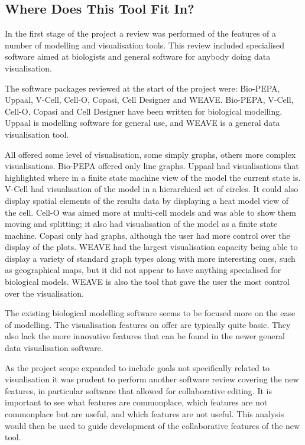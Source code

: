 \subsection{Where Does This Tool Fit In?}

In the first stage of the project a review was performed of the features of a number of modelling and visualisation tools.  This review included specialised software aimed at biologists and general software for anybody doing data visualisation.

The software packages reviewed at the start of the project were: Bio-PEPA, Uppaal, V-Cell, Cell-O, Copasi, Cell Designer and WEAVE.  Bio-PEPA, V-Cell, Cell-O, Copasi and Cell Designer have been written for biological modelling.  Uppaal is modelling software for general use, and WEAVE is a general data visualisation tool.

All offered some level of visualisation, some simply graphs, others more complex visualisations.  Bio-PEPA offered only line graphs.  Uppaal had visualisations that highlighted where in a finite state machine view of the model the current state is.  V-Cell had visualisation of the model in a hierarchical set of circles. It could also display spatial elements of the results data by displaying a heat model view of the cell.  Cell-O was aimed more at multi-cell models and was able to show them moving and splitting; it also had visualisation of the model as a finite state machine.  Copasi only had graphs, although the user had more control over the display of the plots.  WEAVE had the largest visualisation capacity being able to display a variety of standard graph types along with more interesting ones, such as geographical maps, but it did not appear to have anything specialised for biological models.  WEAVE is also the tool that gave the user the most control over the visualisation.

The existing biological modelling software seems to be focused more on the ease of modelling.  The visualisation features on offer are typically quite basic.  They also lack the more innovative features that can be found in the newer general data visualisation software.

As the project scope expanded to include goals not specifically related to visualisation it was prudent to perform another software review covering the new features, in particular software that allowed for collaborative editing.  It is important to see what features are commonplace, which features are not commonplace but are useful, and which features are not useful. This analysis would then be used to guide development of the collaborative features of the new tool.

